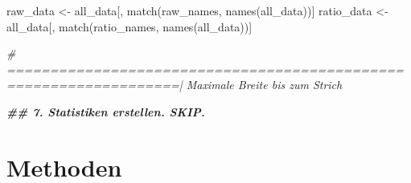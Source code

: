\documentclass[a4paper, nobind]{templates/ociamthesis}
\newenvironment{Shaded}{\begin{snugshade}}{\end{snugshade}}
\newcommand{\CommentTok}[1]{\textcolor[rgb]{0.56,0.35,0.01}{\textit{#1}}}
\newcommand{\DocumentationTok}[1]{\textcolor[rgb]{0.56,0.35,0.01}{\textbf{\textit{#1}}}}
\newcommand{\FunctionTok}[1]{\textcolor[rgb]{0.00,0.00,0.00}{#1}}
\newcommand{\NormalTok}[1]{#1}
\newcommand{\OtherTok}[1]{\textcolor[rgb]{0.56,0.35,0.01}{#1}}
\renewenvironment{Shaded}
{
  \vspace{10pt}%
  \begin{snugshade}%
}{%
  \end{snugshade}%
  \vspace{8pt}%
}
\begin{document}
\begin{Shaded}
\begin{Highlighting}[]
\NormalTok{raw\_data }\OtherTok{\textless{}{-}}\NormalTok{ all\_data[, }\FunctionTok{match}\NormalTok{(raw\_names, }\FunctionTok{names}\NormalTok{(all\_data))]}
\NormalTok{ratio\_data }\OtherTok{\textless{}{-}}\NormalTok{ all\_data[, }\FunctionTok{match}\NormalTok{(ratio\_names, }\FunctionTok{names}\NormalTok{(all\_data))]}

\CommentTok{\# ==================================================================| Maximale Breite bis zum Strich}

\DocumentationTok{\#\# 7. Statistiken erstellen. SKIP. }
\end{Highlighting}
\end{Shaded}

\hypertarget{methods}{%
\chapter{Methoden}\label{methods}}
\end{document}
